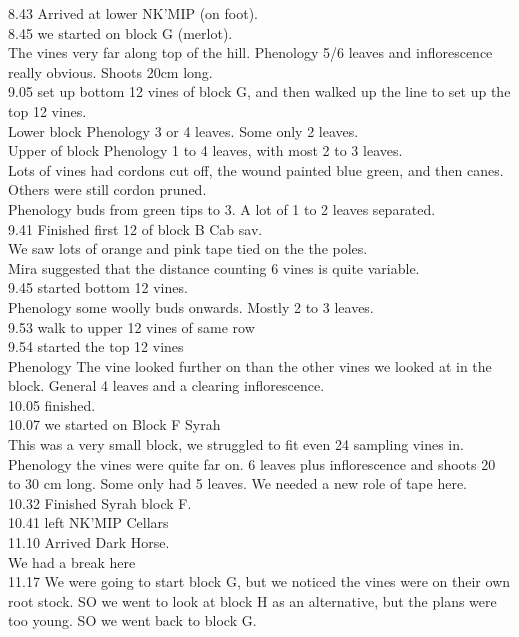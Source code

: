 \documentclass[11pt,letter]{article}
\newenvironment{smitemize}{
\begin{itemize}
  \setlength{\itemsep}{0pt}
  \setlength{\parskip}{0.8pt}
  \setlength{\parsep}{0pt}}
{\end{itemize}
}
\begin{document}
\begin{smitemize}
8.43 Arrived at lower NK'MIP (on foot).\\ 
8.45 we started on block G (merlot). \\
The vines very far along top of the hill. Phenology 5/6 leaves and inflorescence really obvious. Shoots 20cm long.\\
9.05 set up bottom 12 vines of block G, and then walked up the line to set up the top 12 vines.\\
Lower block Phenology 3 or 4 leaves. Some only 2 leaves. \\
Upper of block Phenology 1 to 4 leaves, with most 2 to 3 leaves. \\
Lots of vines had cordons cut off, the wound painted blue green, and then canes. Others were still cordon pruned. \\
Phenology buds from green tips to 3. A lot of 1 to 2 leaves separated. \\
9.41 Finished first 12 of block B Cab sav.\\
We saw lots of orange and pink tape tied on the the poles.\\
Mira suggested that the distance counting 6 vines is quite variable.\\
9.45 started bottom 12 vines. \\
Phenology some woolly buds onwards. Mostly 2 to 3 leaves. \\
9.53 walk to upper 12 vines of same row \\
9.54 started the top 12 vines \\
Phenology The vine looked further on than the other vines we looked at in the block. General 4 leaves and a clearing inflorescence. \\
10.05 finished.\\
10.07 we started on Block F Syrah\\
This was a very small block, we struggled to fit even 24 sampling vines in. \\
Phenology the vines were quite far on. 6 leaves plus inflorescence and shoots 20 to 30 cm long. Some only had 5 leaves. 
We needed a new role of tape here. \\
10.32 Finished Syrah block F.\\
10.41 left NK'MIP Cellars\\
11.10 Arrived Dark Horse. \\
We had a break here \\
11.17 We were going to start block G, but we noticed the vines were on their own root stock. SO we went to look at block H as an alternative, but the plans were too young. SO we went back to block G. \\

\end{smitemize}
\end{document}
